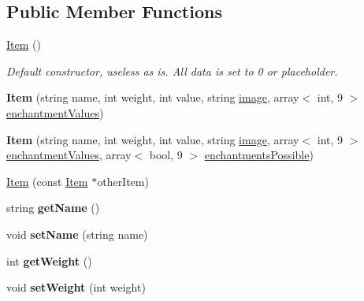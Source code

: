 \subsection*{Public Member Functions}
\begin{DoxyCompactItemize}
\item 
\hypertarget{class_item_a297720c02984eab37332ae795d22189d}{}\label{class_item_a297720c02984eab37332ae795d22189d} 
\hyperlink{class_item_a297720c02984eab37332ae795d22189d}{Item} ()
\begin{DoxyCompactList}\small\item\em Default constructor, useless as is. All data is set to 0 or placeholder. \end{DoxyCompactList}\item 
\hypertarget{class_item_a2df43264bafca3a31662a163cf2b5a3d}{}\label{class_item_a2df43264bafca3a31662a163cf2b5a3d} 
{\bfseries Item} (string name, int weight, int value, string \hyperlink{class_item_add84a42b692ee5d580a92ae4a922f784}{image}, array$<$ int, 9 $>$ \hyperlink{class_item_a8532d8729f9433f41b7fc18b20d83236}{enchantment\+Values})
\item 
\hypertarget{class_item_a96a72e69b788044a98b5f675ae5cfb7c}{}\label{class_item_a96a72e69b788044a98b5f675ae5cfb7c} 
{\bfseries Item} (string name, int weight, int value, string \hyperlink{class_item_add84a42b692ee5d580a92ae4a922f784}{image}, array$<$ int, 9 $>$ \hyperlink{class_item_a8532d8729f9433f41b7fc18b20d83236}{enchantment\+Values}, array$<$ bool, 9 $>$ \hyperlink{class_item_a02a91e8112849f4e2fde342b0c9a0d47}{enchantments\+Possible})
\item 
\hyperlink{class_item_a2f0671713504024a4b63cd63c835f759}{Item} (const \hyperlink{class_item}{Item} $\ast$other\+Item)
\item 
\hypertarget{class_item_a63d7f2148b699e539aae354b01559811}{}\label{class_item_a63d7f2148b699e539aae354b01559811} 
string {\bfseries get\+Name} ()
\item 
\hypertarget{class_item_a5dcdff1db4c66ca22bd6a3f826c69644}{}\label{class_item_a5dcdff1db4c66ca22bd6a3f826c69644} 
void {\bfseries set\+Name} (string name)
\item 
\hypertarget{class_item_a56817af92c3db19016949b3277c83dca}{}\label{class_item_a56817af92c3db19016949b3277c83dca} 
int {\bfseries get\+Weight} ()
\item 
\hypertarget{class_item_a00bbb472ea4fd7faeafc2a3e07729bab}{}\label{class_item_a00bbb472ea4fd7faeafc2a3e07729bab} 
void {\bfseries set\+Weight} (int weight)
\item 

\end{DoxyCompactItemize}
